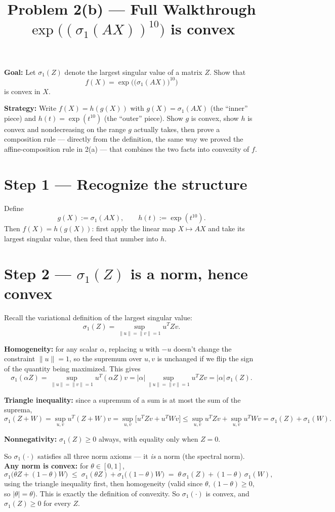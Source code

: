 \documentclass[11pt]{article}
\title{Problem 2(b) --- Full Walkthrough\\ \large $\exp\big((\sigma_1(AX))^{10}\big)$ is convex}
\author{}
\date{}
\begin{document}
\maketitle

\textbf{Goal:} Let $\sigma_1(Z)$ denote the largest singular value of a matrix $Z$. Show that
\[
f(X) = \exp\Big( \big(\sigma_1(AX)\big)^{10} \Big)
\]
is convex in $X$.

\textbf{Strategy:} Write $f(X) = h(g(X))$ with $g(X) = \sigma_1(AX)$ (the ``inner'' piece) and $h(t) = \exp(t^{10})$ (the ``outer'' piece). Show $g$ is convex, show $h$ is convex and nondecreasing on the range $g$ actually takes, then prove a composition rule --- directly from the definition, the same way we proved the affine-composition rule in 2(a) --- that combines the two facts into convexity of $f$.

\section*{Step 1 --- Recognize the structure}

Define
\[
g(X) := \sigma_1(AX), \qquad h(t) := \exp(t^{10}).
\]
Then $f(X) = h(g(X))$: first apply the linear map $X \mapsto AX$ and take its largest singular value, then feed that number into $h$.

\section*{Step 2 --- $\sigma_1(Z)$ is a norm, hence convex}

Recall the variational definition of the largest singular value:
\[
\sigma_1(Z) = \sup_{\|u\|=\|v\|=1} u^TZv.
\]

\textbf{Homogeneity:} for any scalar $\alpha$, replacing $u$ with $-u$ doesn't change the constraint $\|u\|=1$, so the supremum over $u,v$ is unchanged if we flip the sign of the quantity being maximized. This gives
\[
\sigma_1(\alpha Z) = \sup_{\|u\|=\|v\|=1} u^T(\alpha Z)v = |\alpha| \sup_{\|u\|=\|v\|=1} u^TZv = |\alpha|\,\sigma_1(Z).
\]

\textbf{Triangle inequality:} since a supremum of a sum is at most the sum of the suprema,
\[
\sigma_1(Z+W) = \sup_{u,v} u^T(Z+W)v = \sup_{u,v}\big[u^TZv + u^TWv\big] \le \sup_{u,v} u^TZv + \sup_{u,v} u^TWv = \sigma_1(Z)+\sigma_1(W).
\]

\textbf{Nonnegativity:} $\sigma_1(Z)\ge 0$ always, with equality only when $Z=0$.

So $\sigma_1(\cdot)$ satisfies all three norm axioms --- it \emph{is} a norm (the spectral norm). \textbf{Any norm is convex:} for $\theta\in[0,1]$,
\[
\sigma_1\big(\theta Z + (1-\theta)W\big) \;\le\; \sigma_1(\theta Z) + \sigma_1\big((1-\theta)W\big) \;=\; \theta\,\sigma_1(Z) + (1-\theta)\,\sigma_1(W),
\]
using the triangle inequality first, then homogeneity (valid since $\theta,(1-\theta)\ge 0$, so $|\theta|=\theta$). This is exactly the definition of convexity. So $\sigma_1(\cdot)$ is convex, and $\sigma_1(Z) \ge 0$ for every $Z$.
\end{document}

